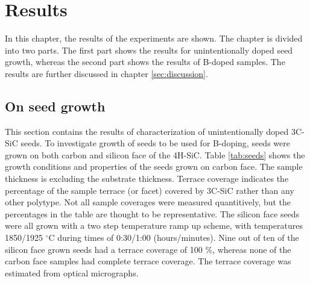 

	
	

	
	

\chapter{Results}
\label{sec:results}
In this chapter, the results of the experiments are shown. The chapter is divided into two parts. The first part shows the results for unintentionally doped seed growth, whereas the second part shows the results of B-doped samples. The results are further discussed in chapter \ref{sec:discussion}. 

\section{On seed growth}
\label{sec:results:seeds}
This section contains the results of characterization of unintentionally doped 3C-SiC seeds. To investigate growth of seeds to be used for B-doping, seeds were grown on both carbon and silicon face of the 4H-SiC. Table \ref{tab:seeds} shows the growth conditions and properties of the seeds grown on carbon face. The sample thickness is excluding the substrate thickness. Terrace coverage indicates the percentage of the sample terrace (or facet) covered by 3C-SiC rather than any other polytype. Not all sample coverages were measured quantitively, but the percentages in the table are thought to be representative. The silicon face seeds were all grown with a two step temperature ramp up scheme, with temperatures 1850/1925 $^\circ$C during times of 0:30/1:00 (hours/minutes). Nine out of ten of the silicon face grown seeds had a terrace coverage of 100 \%, whereas none of the carbon face samples had complete terrace coverage. The terrace coverage was estimated from optical micrographs.

